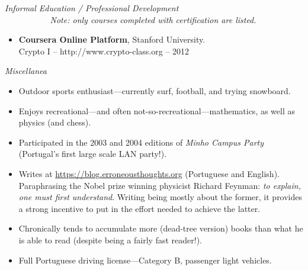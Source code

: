 \documentclass[a4paper,9pt]{extarticle}
\newenvironment{topic}[1]
   {{\noindent\large\bfseries\raisebox{0pt}[\height][1ex]{#1}\hrule}%
    \begin{list}{}{%
       \setlength{\leftmargin}{.25cm}}%
    \item[]}
   {\end{list}\medskip}
\begin{document}
\newpage
\begin{topic}{Additional Information}
  {\itshape Informal Education / Professional Development}\\ 
  {\slshape \small \mbox{\ \ \ \ \ \ \ \ \ \ } Note: only courses completed with certification are listed.}
  \begin{itemize}
    \item {\bfseries Coursera Online Platform}, Stanford University.\\
      Crypto I -- http://www.crypto-class.org -- 2012
  \end{itemize}
  {\itshape Miscellanea}  
  \begin{itemize}
    \item{Outdoor sports enthusiast---currently surf, football, and trying
      snowboard.}
    \item{Enjoys recreational---and often not-so-recreational---mathematics,
      as well as physics (and chess).}
    \item{Participated in the 2003 and 2004 editions of \emph{Minho Campus
      Party} (Portugal's first large scale LAN party!).}
    \item Writes at \url{https://blog.erroneousthoughts.org} (Portuguese and 
      English). Paraphrasing the Nobel prize winning physicist Richard Feynman: 
      \emph{to explain, one must first understand}. Writing being mostly about 
      the former, it provides a strong incentive to put in the effort needed to 
      achieve the latter.
    \item Chronically tends to accumulate more (dead-tree version) books than 
      what he is able to read (despite being a fairly fast reader!).
    \item{Full Portuguese driving license---Category B, passenger light
      vehicles.}
  \end{itemize}
\end{topic}
\end{document}
